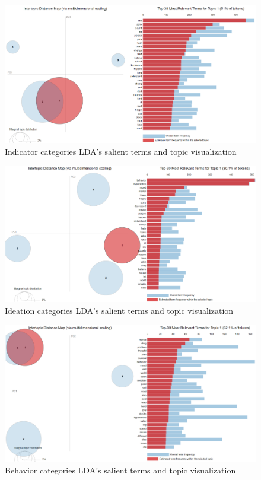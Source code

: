 \documentclass[sn-mathphys,Numbered]{sn-jnl}%
\theoremstyle{thmstyleone}%
\theoremstyle{thmstyletwo}%
\theoremstyle{thmstylethree}%
\begin{document}
\begin{figure}[h!]
\centering
    \includegraphics[width=\textwidth]{indicator_pyldvis.png}
    \caption{Indicator categories LDA's salient terms and topic visualization}
    \label{indicator_pyldvis}
\end{figure}
\begin{figure}[h!]
    \includegraphics[width=\textwidth]{Ideation_pyldvis.png}
    \caption{Ideation categories LDA's salient terms and topic visualization}
    \label{Ideation_pyldvis}
\end{figure}
\begin{figure}[h!]
    \includegraphics[width=\textwidth]{Behavior_pyldvis.png}
    \caption{Behavior categories LDA's salient terms and topic visualization}
    \label{Behavior_pyldvis}
\end{figure}
\end{document}
